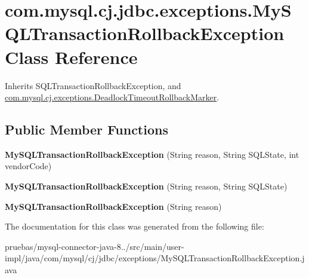 \hypertarget{classcom_1_1mysql_1_1cj_1_1jdbc_1_1exceptions_1_1_my_s_q_l_transaction_rollback_exception}{}\section{com.\+mysql.\+cj.\+jdbc.\+exceptions.\+My\+S\+Q\+L\+Transaction\+Rollback\+Exception Class Reference}
\label{classcom_1_1mysql_1_1cj_1_1jdbc_1_1exceptions_1_1_my_s_q_l_transaction_rollback_exception}


Inherits S\+Q\+L\+Transaction\+Rollback\+Exception, and \mbox{\hyperlink{interfacecom_1_1mysql_1_1cj_1_1exceptions_1_1_deadlock_timeout_rollback_marker}{com.\+mysql.\+cj.\+exceptions.\+Deadlock\+Timeout\+Rollback\+Marker}}.

\subsection*{Public Member Functions}
\begin{DoxyCompactItemize}
\item 
\mbox{\label{classcom_1_1mysql_1_1cj_1_1jdbc_1_1exceptions_1_1_my_s_q_l_transaction_rollback_exception_ac4874443ba9b32a6798978bbff83adf1}} 
{\bfseries My\+S\+Q\+L\+Transaction\+Rollback\+Exception} (String reason, String S\+Q\+L\+State, int vendor\+Code)
\item 
\mbox{\label{classcom_1_1mysql_1_1cj_1_1jdbc_1_1exceptions_1_1_my_s_q_l_transaction_rollback_exception_ab52de149ce388c6088e916cead845580}} 
{\bfseries My\+S\+Q\+L\+Transaction\+Rollback\+Exception} (String reason, String S\+Q\+L\+State)
\item 
\mbox{\label{classcom_1_1mysql_1_1cj_1_1jdbc_1_1exceptions_1_1_my_s_q_l_transaction_rollback_exception_a8e68bb1ea2bb2b8b4c7c7aad040ba847}} 
{\bfseries My\+S\+Q\+L\+Transaction\+Rollback\+Exception} (String reason)
\end{DoxyCompactItemize}


The documentation for this class was generated from the following file\+:\begin{DoxyCompactItemize}
\item 
pruebas/mysql-\/connector-\/java-\/8../src/main/user-\/impl/java/com/mysql/cj/jdbc/exceptions/My\+S\+Q\+L\+Transaction\+Rollback\+Exception.\+java\end{DoxyCompactItemize}
